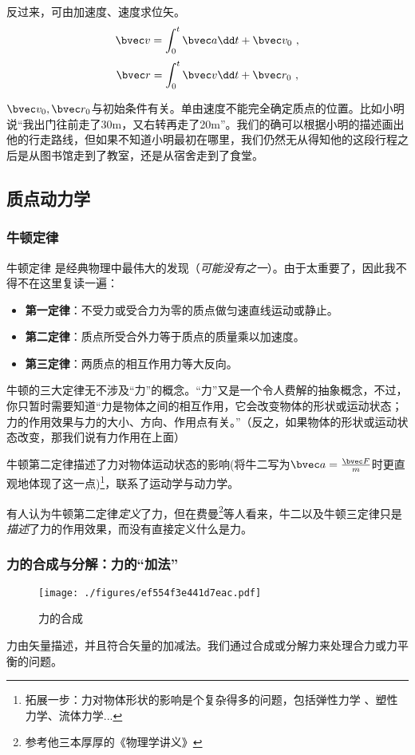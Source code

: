 反过来，可由加速度、速度求位矢。
$$
\bvec v = \int^{t}_0\bvec a \dd t + \bvec v_0~,
$$
$$
\bvec r = \int^{t}_0\bvec v \dd t + \bvec r_0~,
$$

$\bvec v_0, \bvec r_0$与初始条件有关。单由速度不能完全确定质点的位置。比如小明说“我出门往前走了30m，又右转再走了20m”。我们的确可以根据小明的描述画出他的行走路线，但如果不知道小明最初在哪里，我们仍然无从得知他的这段行程之后是从图书馆走到了教室，还是从宿舍走到了食堂。

\subsection{质点动力学}

\subsubsection{牛顿定律}
牛顿定律 是经典物理中最伟大的发现（\textsl{可能没有之一}）。由于太重要了，因此我不得不在这里复读一遍：

\begin{itemize}
\item \textbf{第一定律}：不受力或受合力为零的质点做匀速直线运动或静止。
\item \textbf{第二定律}：质点所受合外力等于质点的质量乘以加速度。
\item \textbf{第三定律}：两质点的相互作用力等大反向。
\end{itemize}

牛顿的三大定律无不涉及“力”的概念。“力”又是一个令人费解的抽象概念，不过，你只暂时需要知道“力是物体之间的相互作用，它会改变物体的形状或运动状态；力的作用效果与力的大小、方向、作用点有关。”（反之，如果物体的形状或运动状态改变，那我们说有力作用在上面）

牛顿第二定律描述了力对物体运动状态的影响(将牛二写为$\bvec a = \frac{\bvec F}{m}$时更直观地体现了这一点)\footnote{拓展一步：力对物体形状的影响是个复杂得多的问题，包括弹性力学 、塑性力学、流体力学...}，联系了运动学与动力学。

有人认为牛顿第二定律\textsl{定义}了力，但在费曼\footnote{参考他三本厚厚的《物理学讲义》}等人看来，牛二以及牛顿三定律只是\textsl{描述}了力的作用效果，而没有直接定义什么是力。

\subsubsection{力的合成与分解：力的“加法”}
\begin{figure}[ht]
\centering
\texttt{[image: ./figures/ef554f3e441d7eac.pdf]}
\caption{力的合成} \label{fig_MPAB_4}
\end{figure}
力由矢量描述，并且符合矢量的加减法。我们通过合成或分解力来处理合力或力平衡的问题。

